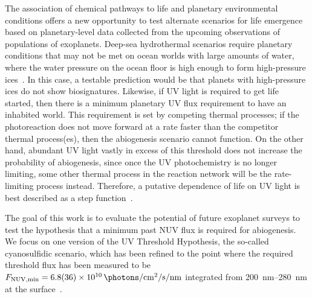 \documentclass[twocolumn,twocolappendix,linenumbers]{aastex631}
\begin{document}
The association of chemical pathways to life and planetary environmental conditions offers a new opportunity to test alternate scenarios for life emergence based on planetary-level data collected from the upcoming observations of populations of exoplanets.
Deep-sea hydrothermal scenarios require planetary conditions that may not be met on ocean worlds with large amounts of water, where the water pressure on the ocean floor is high enough to form high-pressure ices~\citep{Noack2016,Kite2018}.  %
In this case, a testable prediction would be that planets with high-pressure ices do not show biosignatures.
Likewise, if \gls{UV} light is required to get life started, then there is a minimum planetary \gls{UV} flux requirement to have an inhabited world.
This requirement is set by competing thermal processes; if the photoreaction does not move forward at a rate faster than the competitor thermal process(es), then the abiogenesis scenario cannot function.
On the other hand, abundant \gls{UV} light vastly in excess of this threshold does not increase the probability of abiogenesis, since once the \gls{UV} photochemistry is no longer limiting, some other thermal process in the reaction network will be the rate-limiting process instead.
Therefore, a putative dependence of life on \gls{UV} light is best described as a step function~\citep[e.g.,][]{Ranjan2017c,Rimmer2018,Rimmer2021}.

The goal of this work is to evaluate the potential of future exoplanet surveys to test the hypothesis that a minimum past \gls{NUV} flux is required for abiogenesis.
We focus on one version of the UV Threshold Hypothesis, the so-called cyanosulfidic scenario, which has been refined to the point where the required threshold flux has been measured to be $F_\mathrm{NUV, min} = \SI{6.8\pm3.6 e10}{\photons\per\centi\meter\squared\per\second\per\nano\meter}$ integrated from \SIrange{200}{280}{\nano\meter} at the surface~\citep{Rimmer2018,Rimmer2021a,Rimmer2023,Ranjan2023a}.
\end{document}
